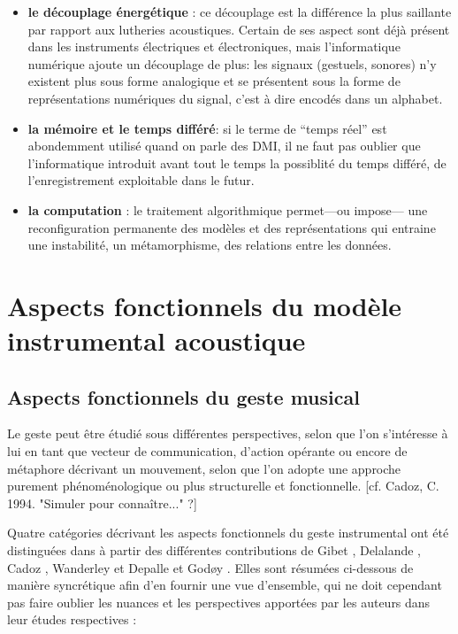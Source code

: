 \vspace{-1em}
\begin{itemize}[noitemsep]
\item \textbf{le découplage énergétique} : ce découplage est la différence la plus saillante par rapport aux lutheries acoustiques. Certain de ses aspect sont déjà présent dans les instruments électriques et électroniques, mais l'informatique numérique ajoute un découplage de plus: les signaux (gestuels, sonores) n'y existent plus sous forme analogique et se présentent sous la forme de représentations numériques du signal, c'est à dire encodés dans un alphabet.
\item \textbf{la mémoire et le temps différé}: si le terme de ``temps réel'' est abondemment utilisé quand on parle des DMI, il ne faut pas oublier que l'informatique introduit avant tout le temps la possiblité du temps différé, de l'enregistrement exploitable dans le futur.
\item \textbf{la computation} : le traitement algorithmique permet—ou impose— une reconfiguration permanente des modèles et des représentations qui entraine une instabilité, un métamorphisme, des relations entre les données.
\end{itemize}




\section{Aspects fonctionnels du modèle instrumental acoustique}

\subsection{Aspects fonctionnels du geste musical}

Le geste peut être étudié sous différentes perspectives, selon que l'on s'intéresse à lui en tant que vecteur de communication, d'action opérante ou encore de métaphore décrivant un mouvement, selon que l'on adopte une approche purement phénoménologique ou plus structurelle et fonctionnelle. [cf. Cadoz, C. 1994. "Simuler pour connaître..." ?]

Quatre catégories décrivant les aspects fonctionnels du geste instrumental ont été distinguées dans \cite{jensenius_musical_2010} à partir des différentes contributions de Gibet \cite{gibet_codage_1987}, Delalande \cite{delalande_geste_1988}, Cadoz \cite{cadoz_gesture_2000}, Wanderley et Depalle\cite{wanderley_gestural_2004} et Godøy \cite{godoy_exploring_2006}. Elles sont résumées ci-dessous de manière syncrétique afin d'en fournir une vue d'ensemble, qui ne doit cependant pas faire oublier les nuances et les perspectives apportées par les auteurs dans leur études respectives :

